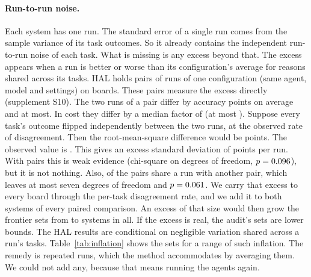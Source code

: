 \documentclass[11pt]{article}
\begin{document}
\paragraph{Run-to-run noise.}
Each system has one run. The standard error of a single run comes from the sample variance of its task outcomes. So it already contains the independent run-to-run noise of each task. What is missing is any excess beyond that. The excess appears when a run is better or worse than its configuration's average for reasons shared across its tasks. HAL holds \NumRerunPairs{} pairs of runs of one configuration (same agent, model and settings) on \NumRerunBoards{} boards. These pairs measure the excess directly (supplement S10). The two runs of a pair differ by \NumRerunMeanAbsDiffPt{} accuracy points on average and \NumRerunMaxAbsDiffPt{} at most. In cost they differ by a median factor of \NumRerunCostRatioMedian{} (at most \NumRerunCostRatioMax{}). Suppose every task's outcome flipped independently between the two runs, at the observed rate of disagreement. Then the root-mean-square difference would be \NumRerunRmsIndepPt{} points. The observed value is \NumRerunRmsObsPt{}. This gives an excess standard deviation of \NumRerunExcessSdPt{} points per run. With \NumRerunPairs{} pairs this is weak evidence (chi-square \NumRerunChiSq{} on \NumRerunDf{} degrees of freedom, $p=0.096{}$), but it is not nothing. Also, \NumRerunPairsSharingRuns{} of the pairs share a run with another pair, which leaves at most seven degrees of freedom and $p=0.061{}$. We carry that excess to every board through the per-task disagreement rate, and we add it to both systems of every paired comparison. An excess of that size would then grow the frontier sets from \NumRerunSetBefore{} to \NumRerunSetAfter{} systems in all. If the excess is real, the audit's sets are lower bounds. The HAL results are conditional on negligible variation shared across a run's tasks. Table~\ref{tab:inflation} shows the sets for a range of such inflation. The remedy is repeated runs, which the method accommodates by averaging them. We could not add any, because that means running the agents again.
\end{document}
